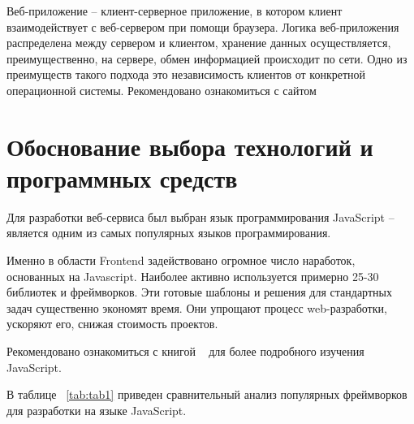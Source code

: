 Веб-приложение – клиент-серверное приложение, в котором клиент взаимодействует с веб-сервером при помощи браузера. Логика веб-приложения распределена между сервером и клиентом, хранение данных осуществляется, преимущественно, на сервере, обмен информацией происходит по сети. Одно из преимуществ такого подхода это независимость клиентов от конкретной операционной системы.
Рекомендовано ознакомиться с сайтом ~\cite{PortalTpu}

\section{Обоснование выбора технологий и программных средств}

Для разработки веб-сервиса был выбран язык программирования JavaScript – является одним из самых популярных языков программирования.

Именно в области Frontend задействовано огромное число наработок, основанных на Javascript. Наиболее активно используется примерно 25-30 библиотек и фреймворков. Эти готовые шаблоны и решения для стандартных задач существенно экономят время. Они упрощают процесс web-разработки, ускоряют его, снижая стоимость проектов.

Рекомендовано ознакомиться с книгой ~\cite{JsBook} для более подробного изучения JavaScript.

В таблице ~\ref{tab:tab1} приведен сравнительный анализ популярных фреймворков для разработки на языке JavaScript.

